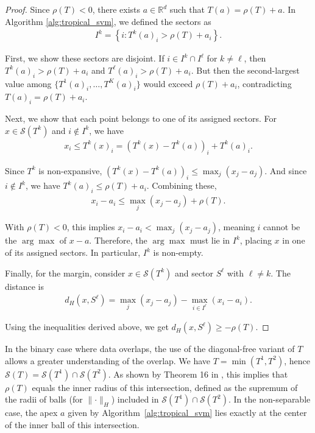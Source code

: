 \documentclass{article}
\renewcommand{\geq}{\geqslant}
\renewcommand{\leq}{\leqslant}
\newcommand{\R}{\mathbb{R}}
\begin{document}
\begin{proof}
Since $\rho(T) < 0$, there exists $a \in \R^d$ such that $T(a) = \rho(T) + a$. In Algorithm \ref{alg:tropical_svm}, we defined the sectors as
\begin{align}
I^k = \left\{i : T^k(a)_i > \rho(T) + a_i\right\}.
\end{align}

First, we show these sectors are disjoint. If $i \in I^k \cap I^{\ell}$ for $k \neq \ell$, then $T^k(a)_i > \rho(T) + a_i$ and $T^{\ell}(a)_i > \rho(T) + a_i$. But then the second-largest value among $\{T^1(a)_i,\ldots,T^K(a)_i\}$ would exceed $\rho(T) + a_i$, contradicting $T(a)_i = \rho(T) + a_i$.

Next, we show that each point belongs to one of its assigned sectors. For $x \in \mathcal{S}(T^k)$ and $i \not\in I^k$, we have
\begin{align}
x_i \leq T^k(x)_i = (T^k(x) - T^k(a))_i + T^k(a)_i.
\end{align}

Since $T^k$ is non-expansive, $(T^k(x) - T^k(a))_i \leq \max_j(x_j - a_j)$. And since $i \not\in I^k$, we have $T^k(a)_i \leq \rho(T) + a_i$. Combining these,
\begin{align}
x_i - a_i \leq \max_j(x_j - a_j) + \rho(T).
\end{align}

With $\rho(T) < 0$, this implies $x_i - a_i < \max_j(x_j - a_j)$, meaning $i$ cannot be the $\arg\max$ of $x - a$. Therefore, the $\arg\max$ must lie in $I^k$, placing $x$ in one of its assigned sectors. In particular, $I^k$ is non-empty.

Finally, for the margin, consider $x \in \mathcal{S}(T^k)$ and sector $S^{\ell}$ with $\ell \neq k$. The distance is 
\begin{align}
d_H(x, S^{\ell}) = \max_j(x_j - a_j) - \max_{i \in I^{\ell}}(x_i - a_i).
\end{align}

Using the inequalities derived above, we get $d_H(x, S^{\ell}) \geq -\rho(T)$.
\end{proof}

In the binary case where data overlaps, the use of the diagonal-free variant of $T$ allows a greater understanding of the overlap. We have $T = \min(T^1, T^2)$, hence $\mathcal{S}(T)=\mathcal{S}(T^1)\cap\mathcal{S}(T^2)$. As shown by Theorem 16 in \cite{allamigeon_condition},
this implies that $\rho(T)$ equals the inner radius of this intersection, defined as the supremum of the radii of balls (for $\lVert\cdot\rVert_H$) included in $\mathcal{S}(T^1) \cap \mathcal{S}(T^2)$. In the non-separable case, the apex $a$ given by Algorithm~\ref{alg:tropical_svm} lies exactly at the center of the inner ball of this intersection.
\end{document}
